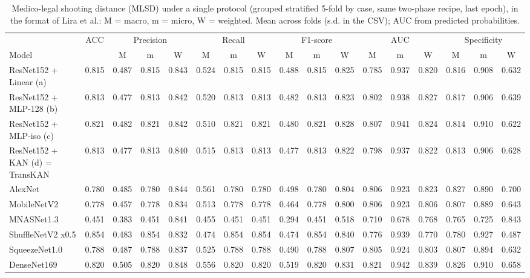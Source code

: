 \begin{table}[t]
\centering
\caption{Medico-legal shooting distance (MLSD) under a single protocol (grouped stratified 5-fold by case, same two-phase recipe, last epoch), in the format of Lira et al.: M = macro, m = micro, W = weighted. Mean across folds (s.d. in the CSV); AUC from predicted probabilities.}
\label{tab:mmw_dist}
\scriptsize
\setlength{\tabcolsep}{2.5pt}
\begin{tabular}{lcccccccccccccccc}
\hline
 & ACC & \multicolumn{3}{c}{Precision} & \multicolumn{3}{c}{Recall} & \multicolumn{3}{c}{F1-score} & \multicolumn{3}{c}{AUC} & \multicolumn{3}{c}{Specificity} \\
Model & & M & m & W & M & m & W & M & m & W & M & m & W & M & m & W \\
\hline
ResNet152 + Linear (a) & 0.815 & 0.487 & 0.815 & 0.843 & 0.524 & 0.815 & 0.815 & 0.488 & 0.815 & 0.825 & 0.785 & 0.937 & 0.820 & 0.816 & 0.908 & 0.632 \\
ResNet152 + MLP-128 (b) & 0.813 & 0.477 & 0.813 & 0.842 & 0.520 & 0.813 & 0.813 & 0.482 & 0.813 & 0.823 & 0.802 & 0.938 & 0.827 & 0.817 & 0.906 & 0.639 \\
ResNet152 + MLP-iso (c) & 0.821 & 0.482 & 0.821 & 0.842 & 0.510 & 0.821 & 0.821 & 0.480 & 0.821 & 0.828 & 0.807 & 0.941 & 0.824 & 0.814 & 0.910 & 0.622 \\
ResNet152 + KAN (d) = TransKAN & 0.813 & 0.477 & 0.813 & 0.840 & 0.515 & 0.813 & 0.813 & 0.477 & 0.813 & 0.822 & 0.798 & 0.937 & 0.822 & 0.813 & 0.906 & 0.628 \\
AlexNet & 0.780 & 0.485 & 0.780 & 0.844 & 0.561 & 0.780 & 0.780 & 0.498 & 0.780 & 0.804 & 0.806 & 0.923 & 0.823 & 0.827 & 0.890 & 0.700 \\
MobileNetV2 & 0.778 & 0.457 & 0.778 & 0.834 & 0.513 & 0.778 & 0.778 & 0.464 & 0.778 & 0.800 & 0.806 & 0.923 & 0.806 & 0.807 & 0.889 & 0.643 \\
MNASNet1.3 & 0.451 & 0.383 & 0.451 & 0.841 & 0.455 & 0.451 & 0.451 & 0.294 & 0.451 & 0.518 & 0.710 & 0.678 & 0.768 & 0.765 & 0.725 & 0.843 \\
ShuffleNetV2 x0.5 & 0.854 & 0.483 & 0.854 & 0.832 & 0.474 & 0.854 & 0.854 & 0.474 & 0.854 & 0.840 & 0.776 & 0.939 & 0.770 & 0.780 & 0.927 & 0.487 \\
SqueezeNet1.0 & 0.788 & 0.487 & 0.788 & 0.837 & 0.525 & 0.788 & 0.788 & 0.490 & 0.788 & 0.807 & 0.805 & 0.924 & 0.803 & 0.807 & 0.894 & 0.632 \\
DenseNet169 & 0.820 & 0.505 & 0.820 & 0.848 & 0.556 & 0.820 & 0.820 & 0.519 & 0.820 & 0.831 & 0.821 & 0.942 & 0.839 & 0.826 & 0.910 & 0.658 \\

\end{tabular}
\end{table}
